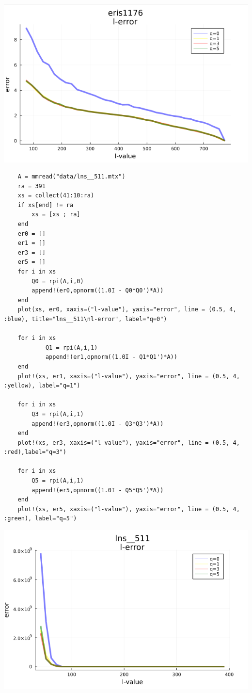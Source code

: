 \documentclass[11pt,a4paper]{article}
\theoremstyle{definition}
\begin{document}
	\includegraphics[scale=0.5]{images/4.3_3.png}
	\begin{lstlisting}
	A = mmread("data/lns__511.mtx")
	ra = 391
	xs = collect(41:10:ra)
	if xs[end] != ra
	    xs = [xs ; ra]
	end
	er0 = []
	er1 = []
	er3 = []
	er5 = []
	for i in xs 
	    Q0 = rpi(A,i,0)
	    append!(er0,opnorm((1.0I - Q0*Q0')*A))
	end
	plot(xs, er0, xaxis=("l-value"), yaxis="error", line = (0.5, 4, :blue), title="lns__511\nl-error", label="q=0")
	
	for i in xs 
	        Q1 = rpi(A,i,1)
	        append!(er1,opnorm((1.0I - Q1*Q1')*A))
	end
	plot!(xs, er1, xaxis=("l-value"), yaxis="error", line = (0.5, 4, :yellow), label="q=1")
	
	for i in xs 
	    Q3 = rpi(A,i,1)
	    append!(er3,opnorm((1.0I - Q3*Q3')*A))
	end
	plot!(xs, er3, xaxis=("l-value"), yaxis="error", line = (0.5, 4, :red),label="q=3")
	
	for i in xs 
	    Q5 = rpi(A,i,1)
	    append!(er5,opnorm((1.0I - Q5*Q5')*A))
	end
	plot!(xs, er5, xaxis=("l-value"), yaxis="error", line = (0.5, 4, :green), label="q=5")

	\end{lstlisting}
	\includegraphics[scale=0.5]{images/4.3_4.png}
\end{document}
